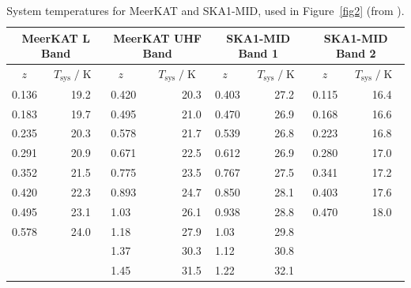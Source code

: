 \vspace*{-0.5cm}
\begin{table} 
\centering
\caption{\label{tab:skasystemp} System temperatures for MeerKAT and SKA1-MID, used in Figure~\ref{fig2} (from \cite{Fonseca:2019qek}).} 
\vspace*{0.2cm}
  \begin{tabular}{|l|l|l|l|l|l|l|l|}
    \hline
      \multicolumn{2}{|c|}{MeerKAT L Band} &
      \multicolumn{2}{c|}{MeerKAT UHF Band} &
      \multicolumn{2}{c|}{SKA1-MID Band 1} & 
      \multicolumn{2}{c|}{SKA1-MID Band 2} \\
      \hline \hline
    $~~~~z~~$ & $~~T_\mathrm{sys}\;/\;\mathrm{K}~~~$ & $~~~z~$ & $~~~~T_\mathrm{sys}\;/\;\mathrm{K}~~$ & $~~~z~$ & $~~T_\mathrm{sys}\;/\;\mathrm{K}~~$ & $~~~~z~~$ & $~~T_\mathrm{sys}\;/\;\mathrm{K}~~$ \\
    \hline
    
  
     0.136 & ~~~~19.2 & 0.420 & ~~~~~~20.3 & 0.403 & ~~~~27.2 & 0.115 & ~~~~16.4 \\
    
     0.183 & ~~~~19.7 & 0.495 & ~~~~~~21.0 & 0.470 & ~~~~26.9 & 0.168 & ~~~~16.6 \\
    
     0.235 & ~~~~20.3 & 0.578 & ~~~~~~21.7 & 0.539 & ~~~~26.8 & 0.223 & ~~~~16.8 \\
    
     0.291 & ~~~~20.9 & 0.671 & ~~~~~~22.5 & 0.612 & ~~~~26.9 & 0.280 & ~~~~17.0 \\
    
     0.352 & ~~~~21.5 & 0.775 & ~~~~~~23.5 & 0.767 & ~~~~27.5 & 0.341 & ~~~~17.2 \\
    
    0.420 & ~~~~22.3 & 0.893 & ~~~~~~24.7  & 0.850 & ~~~~28.1 & 0.403 & ~~~~17.6 \\
    
    0.495 & ~~~~23.1 & 1.03 & ~~~~~~26.1   & 0.938 & ~~~~28.8 & 0.470  & ~~~~18.0 \\
    
    0.578 & ~~~~24.0 & 1.18 & ~~~~~~27.9   & 1.03  & ~~~~29.8 &        &  \\
    
          &          & 1.37 & ~~~~~~30.3   & 1.12  & ~~~~30.8 &        &  \\
     
          &          & 1.45 & ~~~~~~31.5   & 1.22  & ~~~~32.1 &        &  \\
    

\end{tabular}
\end{table}
